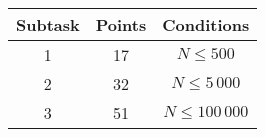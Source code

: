 \begin{tabular}{|c|c|c|}
\hline
\bf{Subtask}&\bf{Points}&\bf{Conditions}\\\hline
1&17& $N \le 500$\\\hline
2&32& $N \le 5\,000$\\\hline
3&51& $N \le 100\,000$\\\hline
\end{tabular}